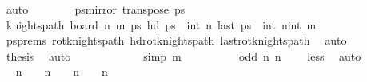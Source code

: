 \begin{isabellebody}
\ auto\isanewline
\ \ \ \ \ \ \isamarkupfalse%
\ {\isacharquery}{\kern0pt}ps{\isacharprime}{\kern0pt}{\isacharequal}{\kern0pt}{\isachardoublequoteopen}mirror{}\ {\isacharparenleft}{\kern0pt}transpose\ ps{\isacharparenright}{\kern0pt}{\isachardoublequoteclose}\isanewline
\ \ \ \ \ \ \isamarkupfalse%
\ {\isachardoublequoteopen}knights{\isacharunderscore}{\kern0pt}path\ {\isacharparenleft}{\kern0pt}board\ n\ m{\isacharparenright}{\kern0pt}\ {\isacharquery}{\kern0pt}ps{\isacharprime}{\kern0pt}{\isachardoublequoteclose}\ {\isachardoublequoteopen}hd\ {\isacharquery}{\kern0pt}ps{\isacharprime}{\kern0pt}\ {\isacharequal}{\kern0pt}\ {\isacharparenleft}{\kern0pt}int\ n{\isacharcomma}{\kern0pt}{}{\isacharparenright}{\kern0pt}{\isachardoublequoteclose}\ {\isachardoublequoteopen}last\ {\isacharquery}{\kern0pt}ps{\isacharprime}{\kern0pt}\ {\isacharequal}{\kern0pt}\ {\isacharparenleft}{\kern0pt}int\ n{\isacharminus}{\kern0pt}{}{\isacharcomma}{\kern0pt}int\ m{\isacharminus}{\kern0pt}{}{\isacharparenright}{\kern0pt}{\isachardoublequoteclose}\isanewline
\ \ \ \ \ \ \ \ \isamarkupfalse%
\ ps{\isacharunderscore}{\kern0pt}prems\ rot{}{}{\isacharunderscore}{\kern0pt}knights{\isacharunderscore}{\kern0pt}path\ hd{\isacharunderscore}{\kern0pt}rot{}{}{\isacharunderscore}{\kern0pt}knights{\isacharunderscore}{\kern0pt}path\ last{\isacharunderscore}{\kern0pt}rot{}{}{\isacharunderscore}{\kern0pt}knights{\isacharunderscore}{\kern0pt}path\ \isamarkupfalse%
\ auto\isanewline
\ \ \ \ \ \ \isamarkupfalse%
\ \isamarkupfalse%
\ {\isacharquery}{\kern0pt}thesis\ \isamarkupfalse%
\ auto\isanewline
\ \ \ \ \isamarkupfalse%
\isanewline
\ \ \ \ \ \ \isamarkupfalse%
\ {\isacharbrackleft}{\kern0pt}simp{\isacharbrackright}{\kern0pt}{\isacharcolon}{\kern0pt}\ {\isachardoublequoteopen}m\ {\isacharequal}{\kern0pt}\ {}{\isachardoublequoteclose}\isanewline
\ \ \ \ \ \ \isamarkupfalse%
\ {\isachardoublequoteopen}odd\ n{\isachardoublequoteclose}\ {\isachardoublequoteopen}n\ {\isasymge}\ {}{\isachardoublequoteclose}\ \isamarkupfalse%
\ less\ \isamarkupfalse%
\ auto\isanewline
\ \ \ \ \ \ \isamarkupfalse%
\ \isamarkupfalse%
\ {\isachardoublequoteopen}n\ {\isacharequal}{\kern0pt}\ {}\ {\isasymor}\ n\ {\isacharequal}{\kern0pt}\ {}\ {\isasymor}\ n\ {\isacharequal}{\kern0pt}\ {}\ {\isasymor}\ n{\isacharminus}{\kern0pt}{}\ {\isasymge}\ {}{\isachardoublequoteclose}\ \isamarkupfalse%

\end{isabellebody}
